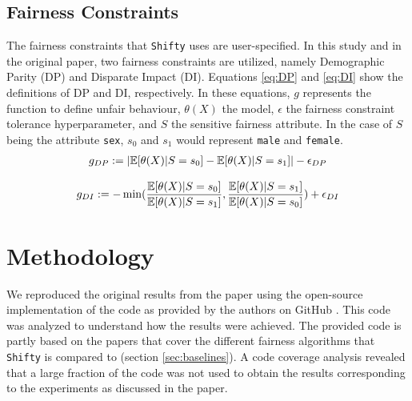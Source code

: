 \subsection{Fairness Constraints}
The fairness constraints that \texttt{Shifty} uses are user-specified. In this study and in the original paper, two fairness constraints are utilized, namely Demographic Parity (DP) and Disparate Impact (DI). Equations \ref{eq:DP} and \ref{eq:DI} show the definitions of DP and DI, respectively. In these equations, $g$ represents the function to define unfair behaviour, $\theta(X)$ the model, $\epsilon$ the fairness constraint tolerance hyperparameter, and $S$ the sensitive fairness attribute. In the case of $S$ being the attribute \texttt{sex}, $s_0$ and $s_1$ would represent \texttt{male} and \texttt{female}.
\vspace{-1.5em}
\begin{align}\label{eq:DP}
\footnotesize
    g_{DP} := |\mathbb{E}[\theta(X)|S=s_0] - \mathbb{E}[\theta(X)|S=s_1]| - \epsilon_{DP}
\end{align}

\vspace{-1.5em} %
\begin{align}\label{eq:DI}
\footnotesize
    g_{DI} := - \min(\frac{\mathbb{E}[\theta(X)|S=s_0]}{\mathbb{E}[\theta(X)|S=s_1]}, \frac{\mathbb{E}[\theta(X)|S=s_1]}{\mathbb{E}[\theta(X)|S=s_0]}) + \epsilon_{DI}
\end{align}

\section{Methodology} \label{sec:method}
We reproduced the original results from the paper using the open-source implementation of the code as provided by the authors on GitHub \cite{giguereGithub}. This code was analyzed to understand how the results were achieved. The provided code is partly based on the papers that cover the different fairness algorithms that \texttt{Shifty} is compared to (section \ref{sec:baselines}). A code coverage analysis revealed that a large fraction of the code was not used to obtain the results corresponding to the experiments as discussed in the paper. 


